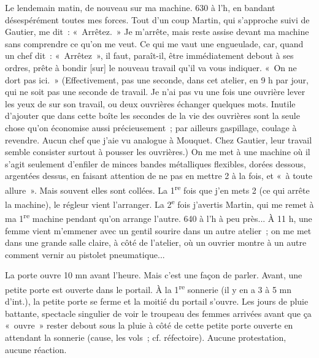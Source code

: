 \documentclass[french,twoside]{book} %
\begin{document}
Le lendemain matin, de nouveau sur ma machine. 630 à l'h, en bandant désespérément toutes mes forces. Tout d'un coup Martin, qui s'approche suivi de Gautier, me dit : « Arrêtez. » Je m'arrête, mais reste assise devant ma machine sans comprendre ce qu'on me veut. Ce qui me vaut une engueulade, car, quand un chef dit : « Arrêtez », il faut, paraît-il, être immédiatement debout à ses ordres, prête à bondir [sur] le nouveau travail qu'il va vous indiquer. « On ne dort pas ici. » (Effectivement, pas une seconde, dans cet atelier, en 9 h par jour, qui ne soit pas une seconde de travail. Je n'ai pas vu une fois une ouvrière lever les yeux de sur son travail, ou deux ouvrières échanger quelques mots. Inutile d'ajouter que dans cette boîte les secondes de la vie des ouvrières sont la seule chose qu'on économise aussi précieusement ; par ailleurs gaspillage, coulage à revendre. Aucun chef que j'aie vu analogue à Mouquet. Chez Gautier, leur travail semble consister surtout à pousser les ouvrières.) On me met à une machine où il s'agit seulement d'enfiler de minces bandes métalliques flexibles, dorées dessous, argentées dessus, en faisant attention de ne pas en mettre 2 à la fois, et « à toute allure ». Mais souvent elles sont collées. La 1\textsuperscript{re} fois que j'en mets 2 (ce qui arrête la machine), le régleur vient l'arranger. La 2\textsuperscript{e} fois j'avertis Martin, qui me remet à ma 1\textsuperscript{re} machine pendant qu'on arrange l'autre. 640 à l'h à peu près... À 11 h, une femme vient m'emmener avec un gentil sourire dans un autre atelier ; on me met dans une grande salle claire, à côté de l'atelier, où un ouvrier montre à un autre comment vernir au pistolet pneumatique...\par
[J'ai oublié de noter mon impression le 1\textsuperscript{er} jour, à 8 h, en arrivant au bureau d'embauche. Moi malgré mes craintes – je suis heureuse, reconnaissante à la boîte, comme une chômeuse enfin casée. Je trouve 5 ou 6 ouvrières qui m'étonnent par leur air morne. J'interroge, on ne dit pas grand-chose ; je comprends enfin que cette boite est un bagne (rythme forcené, doigts coupés à profusion, débauchage sans scrupules) et que la plupart d'entre elles y ont travaillé – soit qu'elles aient été jetées sur le pavé à l'automne, soit qu'elles aient voulu s'évader – et reviennent la rage au cœur, rongeant leur frein.]\par
La porte ouvre 10 mn avant l'heure. Mais c'est une façon de parler. Avant, une petite porte est ouverte dans le portail. À la 1\textsuperscript{re} sonnerie (il y en a 3 à 5 mn d'int.), la petite porte se ferme et la moitié du portail s'ouvre. Les jours de pluie battante, spectacle singulier de voir le troupeau des femmes arrivées avant que ça « ouvre » rester debout sous la pluie à côté de cette petite porte ouverte en attendant la sonnerie (cause, les vols ; cf. réfectoire). Aucune protestation, aucune réaction.\par
\end{document}
